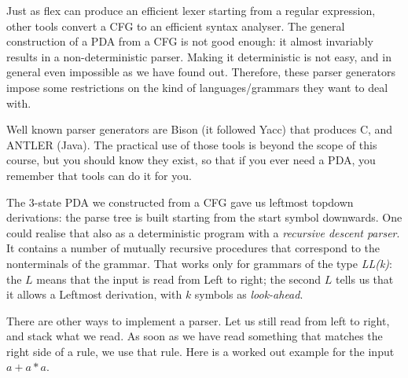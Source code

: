 Just as flex can produce an efficient lexer starting from a regular
expression, other tools convert a CFG to an efficient syntax
analyser. The general construction of a PDA from a CFG is not good
enough: it almost invariably results in a non-deterministic parser.
Making it deterministic is not easy, and in general even impossible as
we have found out. Therefore, these parser generators impose
some restrictions on the kind of languages/grammars they want to deal
with.

Well known parser generators are Bison (it followed Yacc) that
produces C, and ANTLER (Java). The practical use of those tools is
beyond the scope of this course, but you should know they exist, so
that if you ever need a PDA, you remember that tools can do it for
you.


The 3-state PDA we constructed from a CFG gave us leftmost topdown
derivations: the parse tree is built starting from the start symbol
downwards. One could realise that also as a deterministic program with
a {\em recursive descent parser}. It contains a number of mutually
recursive procedures that correspond to the nonterminals of the
grammar. That works only for grammars of the type {\em LL(k)}: the
$L$ means that the input is read from Left to right; the second $L$
tells us that it allows a Leftmost derivation, with $k$ symbols as
{\em look-ahead}.

There are other ways to implement a parser. Let us still read from
left to right, and stack what we read. As soon as we have read
something that matches the right side of a rule, we use that
rule. Here is a worked out example for the input $a+a*a$.


